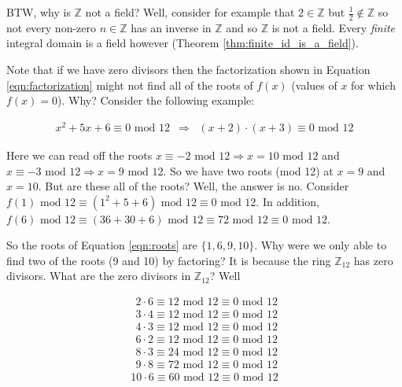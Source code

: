 \documentclass[11pt, oneside]{article}   	%
\theoremstyle{definition}
\begin{document}
\bigskip
\noindent
BTW,  why is $\mathbb{Z}$ not a field? Well, consider for example that $2 \in \mathbb{Z}$ but $\frac{1}{2} \notin \mathbb{Z}$ so not every 
non-zero $n \in \mathbb{Z}$ has an inverse in $\mathbb{Z}$ and so $\mathbb{Z}$  is not a field. Every \emph{finite} 
integral domain is a field however (Theorem \ref{thm:finite_id_is_a_field}).

\bigskip
\noindent
Note that if we have zero divisors then the factorization  shown in Equation \ref{eqn:factorization} might not find all of
the roots of $f(x)$ (values of $x$ for which $f(x) = 0$). Why? Consider the following example:

\begin{equation}
\begin{array}{rcll} 
x^2 + 5x + 6 \equiv 0 \text{ mod } 12
&\Rightarrow& (x + 2) \cdot (x + 3) \equiv 0 \text{ mod } 12 
\end{array}
\label{eqn:roots}
\end{equation}

\bigskip
\noindent
Here we can read off the roots $x \equiv -2 \text{ mod } 12 \Rightarrow x  = 10 \text{ mod } 12$ and 
$x \equiv -3 \text{ mod } 12 \Rightarrow x  = 9 \text{ mod } 12$. So we have two roots (mod 12) 
at $x = 9$ and $x = 10$. But are these all of the roots? Well, the answer is no. Consider
$f(1) \text{ mod } 12 \equiv (1^2 + 5 + 6) \text{ mod } 12 \equiv 0 \text{ mod } 12$. In addition,
$f(6) \text{ mod } 12 \equiv (36 + 30 +6) \text{ mod } 12 \equiv 72 \text{ mod } 12 \equiv 0 \text{ mod } 12$.

\bigskip
\noindent
So the roots of Equation \ref{eqn:roots} are $\{1,6,9,10\}$. Why were we only able to find
two of the roots (9 and 10) by factoring? It is because the ring $\mathbb{Z}_{12}$ has 
zero divisors. What are the zero divisors in $\mathbb{Z}_{12}$? Well


\begin{equation}
\begin{array}{lrcll} 
\,\; 2   \cdot 6     \equiv     12 \text{ mod } 12 \equiv 0 \text{ mod } 12 \\
\,\; 3   \cdot 4     \equiv     12 \text{ mod } 12 \equiv 0 \text{ mod } 12 \\
\,\; 4   \cdot 3     \equiv    12 \text{ mod } 12 \equiv 0 \text{ mod } 12 \\
\,\; 6   \cdot 2     \equiv    12 \text{ mod } 12 \equiv 0  \text{ mod } 12 \\
\,\; 8   \cdot 3     \equiv     24 \text{ mod } 12 \equiv 0  \text{ mod } 12 \\
\,\; 9   \cdot 8     \equiv     72 \text{ mod } 12 \equiv 0  \text{ mod } 12 \\
10      \cdot 6     \equiv     60 \text{ mod } 12 \equiv 0  \text{ mod } 12 \\
\end{array}
\end{equation}
\end{document}
